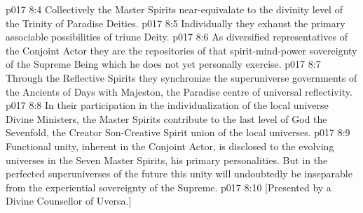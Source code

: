 \vs p017 8:4 \bibnobreakspace Collectively the Master Spirits near\hyp{}equivalate to the divinity level of the Trinity of Paradise Deities.
\vs p017 8:5 \bibnobreakspace Individually they exhaust the primary associable possibilities of triune Deity.
\vs p017 8:6 \bibnobreakspace As diversified representatives of the Conjoint Actor they are the repositories of that spirit\hyp{}mind\hyp{}power sovereignty of the Supreme Being which he does not yet personally exercise.
\vs p017 8:7 \bibnobreakspace Through the Reflective Spirits they synchronize the superuniverse governments of the Ancients of Days with Majeston, the Paradise centre of universal reflectivity.
\vs p017 8:8 \bibnobreakspace In their participation in the individualization of the local universe Divine Ministers, the Master Spirits contribute to the last level of God the Sevenfold, the Creator Son\hyp{}Creative Spirit union of the local universes.
\vs p017 8:9 \pc Functional unity, inherent in the Conjoint Actor, is disclosed to the evolving universes in the Seven Master Spirits, his primary personalities. But in the perfected superuniverses of the future this unity will undoubtedly be inseparable from the experiential sovereignty of the Supreme.
\vsetoff
\vs p017 8:10 [Presented by a Divine Counsellor of Uversa.]
